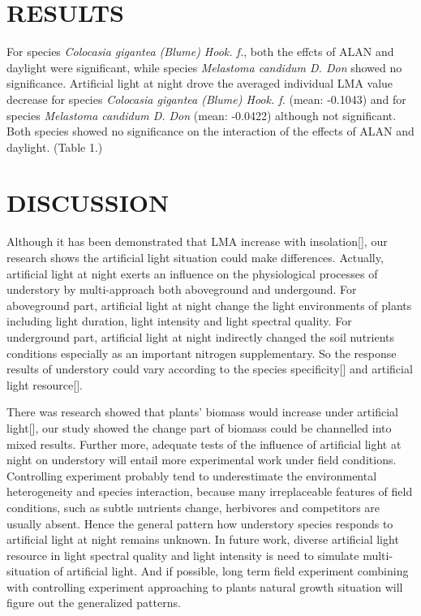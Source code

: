 \documentclass[
]{article}
\begin{document}
\hypertarget{results}{%
\section{RESULTS}\label{results}}

For species \emph{Colocasia gigantea (Blume) Hook. f.}, both the effcts
of ALAN and daylight were significant, while species \emph{Melastoma
candidum D. Don} showed no significance. Artificial light at night drove
the averaged individual LMA value decrease for species \emph{Colocasia
gigantea (Blume) Hook. f.} (mean: -0.1043) and for species
\emph{Melastoma candidum D. Don} (mean: -0.0422) although not
significant. Both species showed no significance on the interaction of
the effects of ALAN and daylight. (Table 1.)

\hypertarget{discussion}{%
\section{DISCUSSION}\label{discussion}}

Although it has been demonstrated that LMA increase with
insolation{[}{]}, our research shows the artificial light situation
could make differences. Actually, artificial light at night exerts an
influence on the physiological processes of understory by multi-approach
both aboveground and undergound. For aboveground part, artificial light
at night change the light environments of plants including light
duration, light intensity and light spectral quality. For underground
part, artificial light at night indirectly changed the soil nutrients
conditions especially as an important nitrogen supplementary. So the
response results of understory could vary according to the species
specificity{[}{]} and artificial light resource{[}{]}.

There was research showed that plants' biomass would increase under
artificial light{[}{]}, our study showed the change part of biomass
could be channelled into mixed results. Further more, adequate tests of
the influence of artificial light at night on understory will entail
more experimental work under field conditions. Controlling experiment
probably tend to underestimate the environmental heterogeneity and
species interaction, because many irreplaceable features of field
conditions, such as subtle nutrients change, herbivores and competitors
are usually absent. Hence the general pattern how understory species
responds to artificial light at night remains unknown. In future work,
diverse artificial light resource in light spectral quality and light
intensity is need to simulate multi-situation of artificial light. And
if possible, long term field experiment combining with controlling
experiment approaching to plants natural growth situation will figure
out the generalized patterns.
\end{document}

